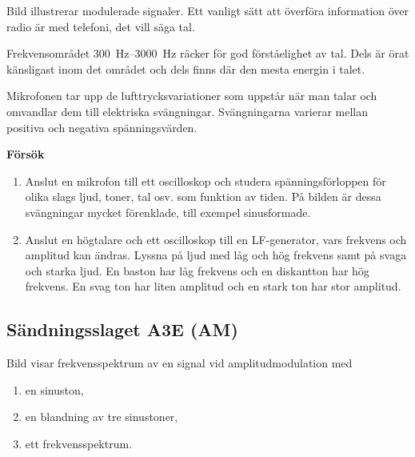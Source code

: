 Bild  illustrerar modulerade signaler.
Ett vanligt sätt att överföra information över radio är med telefoni, det vill
säga tal.

Frekvensområdet \SIrange{300}{3000}{\hertz} räcker för god förståelighet av tal.
Dels är örat känsligast inom det området och dels finns där den mesta energin
i talet.

Mikrofonen tar upp de lufttrycksvariationer som uppstår när man talar och
omvandlar dem till elektriska svängningar.
Svängningarna varierar mellan positiva och negativa spänningsvärden.

\bigskip

\textbf{Försök}

\begin{enumerate}
\item Anslut en mikrofon till ett oscilloskop och studera spänningsförloppen
  för olika slags ljud, toner, tal osv. som funktion av tiden.
  På bilden är dessa svängningar mycket förenklade, till exempel sinusformade.

\item Anslut en högtalare och ett oscilloskop till en LF-generator, vars
frekvens och amplitud kan ändras. Lyssna på ljud med låg och hög frekvens samt
på svaga och starka ljud.
En baston har låg frekvens och en diskantton har hög frekvens.
En svag ton har liten amplitud och en stark ton har stor amplitud.
\end{enumerate}

\subsection{Sändningsslaget A3E (AM)}
\label{modulation_am}


Bild  visar frekvensspektrum av en signal vid
amplitudmodulation med

\begin{enumerate}[label=\alph*.,noitemsep]
\item en sinuston,
\item en blandning av tre sinustoner,
\item ett frekvensspektrum.
\end{enumerate}

